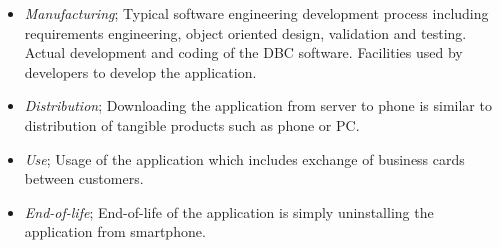 \documentclass[conference]{IEEEtran}
\begin{document}
\begin{itemize}
\item {\em Manufacturing}; Typical software engineering development process including requirements engineering, object oriented design, validation and testing. Actual development and coding of the DBC software. Facilities used by developers to develop the application.
\item {\em Distribution}; Downloading the application from server to phone is similar to distribution of tangible products such as phone or PC.
\item {\em Use}; Usage of the application which includes exchange of business cards between customers. 
\item {\em End-of-life}; End-of-life of the application is simply uninstalling the application from smartphone.
\end{itemize}

\end{document}
